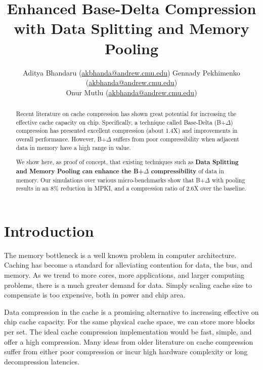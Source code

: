 \documentclass[pageno]{jpaper}
\begin{document}
\title{Enhanced Base-Delta Compression with Data Splitting and Memory Pooling}
\author{Aditya Bhandaru (\href{mailto:akbhanda@andrew.cmu.edu}{akbhanda@andrew.cmu.edu}) Gennady Pekhimenko (\href{mailto:gpekhime@cs.cmu.edu}{akbhanda@andrew.cmu.edu}) \\
Onur Mutlu (\href{mailto:onur@cmu.edu}{akbhanda@andrew.cmu.edu})}
\date{}
\maketitle

\thispagestyle{empty}

\begin{abstract}
Recent literature on cache compression has shown great potential for increasing the effective cache capacity on chip. Specifically, a technique called Base-Delta (B+$\Delta$) compression has presented excellent compression (about 1.4X) and improvements in overall performance. However, B+$\Delta$ suffers from poor compressibility when adjacent data in memory have a high range in value.

We show here, as proof of concept, that existing techniques such as \textbf{Data Splitting and Memory Pooling can enhance the B+$\Delta$ compressibility} of data in memory. Our simulations over various micro-benchmarks show that B+$\Delta$ with pooling  results in an 8\% reduction in MPKI, and a compression ratio of 2.6X over the baseline.
\end{abstract}

\section{Introduction}

The memory bottleneck is a well known problem in computer architecture. Caching has become a standard for alleviating contention for data, the bus, and memory. As we trend to more cores, more applications, and larger computing problems, there is a much greater demand for data. Simply scaling cache size to compensate is too expensive, both in power and chip area.

Data compression in the cache is a promising alternative to increasing effective on chip cache capacity. For the same physical cache space, we can store more blocks per set. The ideal cache compression implementation would be fast, simple, and offer a high compression. Many ideas from older literature on cache compression suffer from either poor compression or incur high hardware complexity or long decompression latencies.
\end{document}
